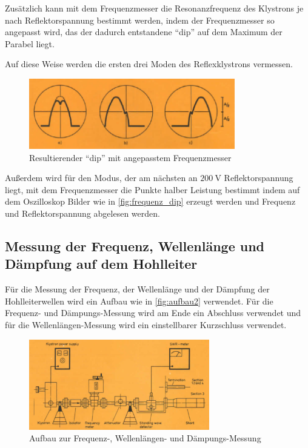 Zusätzlich kann mit dem Frequenzmesser die Resonanzfrequenz des Klystrons je nach Reflektorspannung bestimmt werden,
indem der Frequenzmesser so angepasst wird, das der dadurch entstandene \enquote{dip} auf dem Maximum der Parabel liegt.

Auf diese Weise werden die ersten drei Moden des Reflexklystrons vermessen.

\begin{figure}
    \centering
    \includegraphics[width=0.8\textwidth]{images/frequenz_dip.png}
    \caption{Resultierender \enquote{dip} mit angepasstem Frequenzmesser \cite{V53_old}}
    \label{fig:frequenz_dip}
\end{figure}

Außerdem wird für den Modus, der am nächsten an $\SI{200}{\volt}$ Reflektorspannung liegt, mit dem Frequenzmesser die Punkte halber Leistung bestimmt
indem auf dem Oszilloskop Bilder wie in \autoref{fig:frequenz_dip} erzeugt werden und Frequenz und Reflektorspannung abgelesen werden.

\subsection{Messung der Frequenz, Wellenlänge und Dämpfung auf dem Hohlleiter}
\label{ssec:Messung_Hohlleiter}

Für die Messung der Frequenz, der Wellenlänge und der Dämpfung der Hohlleiterwellen wird ein Aufbau wie in \autoref{fig:aufbau2} verwendet.
Für die Frequenz- und Dämpungs-Messung wird am Ende ein Abschluss verwendet und für die Wellenlängen-Messung wird ein einstellbarer Kurzschluss verwendet.

\begin{figure}
    \centering
    \includegraphics[width=0.7\textwidth]{images/aufbau2.png}
    \caption{Aufbau zur Frequenz-, Wellenlängen- und Dämpungs-Messung \cite{V53_old}}
    \label{fig:aufbau2}
\end{figure}

